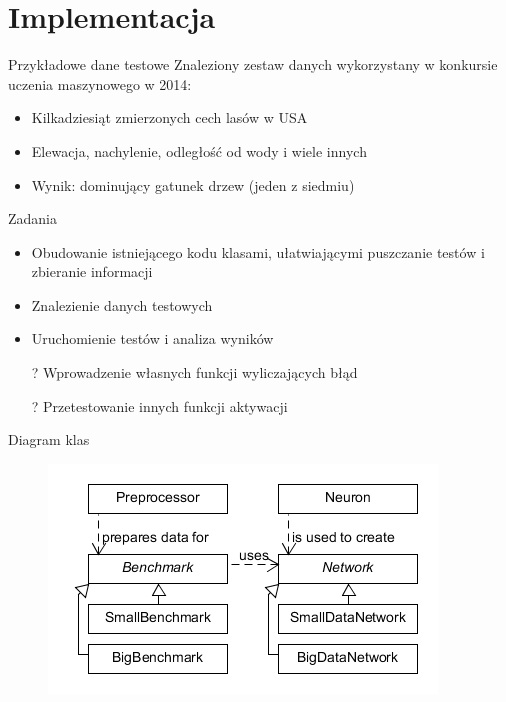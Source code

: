 \documentclass{beamer}
\begin{document}
\section{Implementacja}
\begin{frame}{Przykładowe dane testowe}
Znaleziony zestaw danych wykorzystany w konkursie uczenia maszynowego w 2014:
\begin{itemize}
\item Kilkadziesiąt zmierzonych cech lasów w USA
\item Elewacja, nachylenie, odległość od wody i wiele innych
\item Wynik: dominujący gatunek drzew (jeden z siedmiu)
\end{itemize}
\end{frame}
\begin{frame}{Zadania}
\begin{itemize}
\item Obudowanie istniejącego kodu klasami, ułatwiającymi puszczanie testów i zbieranie informacji
\item Znalezienie danych testowych
\item Uruchomienie testów i analiza wyników
\item[?] Wprowadzenie własnych funkcji wyliczających błąd 
\item[?] Przetestowanie innych funkcji aktywacji
\end{itemize}
\end{frame}

\begin{frame}{Diagram klas}
\begin{figure}
	\includegraphics[width=\textwidth]{classescompact.png}
\end{figure}
\end{frame}
\end{document}
